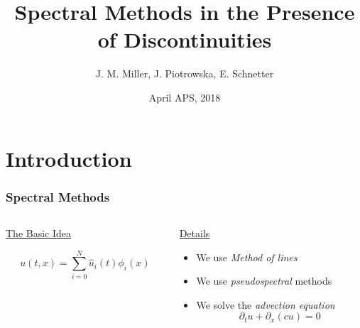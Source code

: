 \documentclass[]{beamer}
\title[Spectral Discontinuities]{Spectral Methods in the Presence of Discontinuities}
\author[Co-Design Summer School]{
  J. M. Miller,
  {\texorpdfstring{\color{blue}}{}J. Piotrowska},
  E. Schnetter}
\institute[LANL]{\color{blue}Los Alamos National Laboratory}
\date[April APS]{\color{black}April APS, 2018}
\begin{document}
\section{Introduction}
\begin{frame}[plain]
  \titlepage
\end{frame}

\begin{frame}
  \frametitle{Spectral Methods}
  \begin{columns}
    \begin{column}{0.5\textwidth}
      \begin{center}
        \underline{\Large\color{blue}The Basic Idea}\\
        \vspace{1.cm}
        \begin{Large}
          $$u(t,x) = \sum_{i=0}^N\hat{u}_i(t)\phi_i(x)$$
        \end{Large}
        \vspace{2cm}
      \end{center}
    \end{column}
    \vrule{}
    \begin{column}{0.5\textwidth}
      \begin{center}
        \underline{\Large\color{red}Details}
      \end{center}
      \vspace{0cm}
      \begin{itemize}
      \item We use \textit{Method of lines}
      \item We use \textit{pseudospectral} methods
      \item We solve the \textit{advection equation}
        { \Large
          $$\partial_t u + \partial_x (c u) = 0 $$
        }
      \end{itemize}
      \vspace{1cm}
    \end{column}
  \end{columns}
\end{frame}
\end{document}
